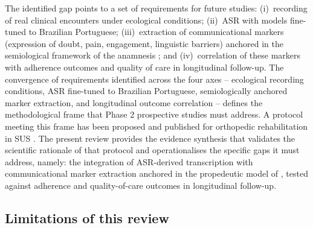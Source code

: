 \documentclass[review,12pt]{elsarticle}
\begin{document}
The identified gap points to a set of requirements for future studies:
(i)~recording of real clinical encounters under ecological conditions;
(ii)~ASR with models fine-tuned to Brazilian Portuguese;
(iii)~extraction of communicational markers (expression of doubt, pain,
engagement, linguistic barriers) anchored in the semiological framework of
the anamnesis \citep{Porto2019}; and
(iv)~correlation of these markers with adherence outcomes and quality of care
in longitudinal follow-up.
The convergence of requirements identified across the four axes --
ecological recording conditions, ASR fine-tuned to Brazilian Portuguese,
semiologically anchored marker extraction, and longitudinal outcome
correlation -- defines the methodological frame that Phase 2 prospective
studies must address. A protocol meeting this frame has been proposed and
published for orthopedic rehabilitation in SUS \citep{BaenaNeto2026}. The
present review provides the evidence synthesis that validates the
scientific rationale of that protocol and operationalises the specific
gaps it must address, namely: the integration of ASR-derived transcription
with communicational marker extraction anchored in the propedeutic model
of \citet{Porto2019}, tested against adherence and quality-of-care
outcomes in longitudinal follow-up.

\subsection*{Limitations of this review}
\end{document}
